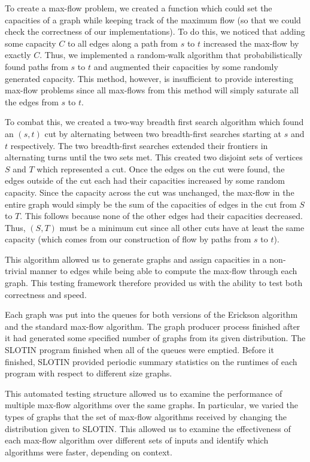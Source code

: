 \documentclass[12pt]{article}
\begin{document}
To create a max-flow problem, we created a function which could set the capacities of a graph while keeping track of the maximum flow (so that we could check the correctness of our implementations). To do this, we noticed that adding some capacity $C$ to all edges along a path from $s$ to $t$ increased the max-flow by exactly $C$. Thus, we implemented a random-walk algorithm that probabilistically found paths from $s$ to $t$ and augmented their capacities by some randomly generated capacity. This method, however, is insufficient to provide interesting max-flow problems since all max-flows from this method will simply saturate all the edges from $s$ to $t$. 

To combat this, we created a two-way breadth first search algorithm which found an $(s,t)$ cut by alternating between two breadth-first searches starting at $s$ and $t$ respectively. The two breadth-first searches extended their frontiers in alternating turns until the two sets met. This created two disjoint sets of vertices $S$ and $T$ which represented a cut. Once the edges on the cut were found, the edges outside of the cut each had their capacities increased by some random capacity. Since the capacity across the cut was unchanged, the max-flow in the entire graph would simply be the sum of the capacities of edges in the cut from $S$ to $T$. This follows because none of the other edges had their capacities decreased. Thus, $(S,T)$ must be a minimum cut since all other cuts have at least the same capacity (which comes from our construction of flow by paths from $s$ to $t$). 

This algorithm allowed us to generate graphs and assign capacities in a non-trivial manner to edges while being able to compute the max-flow through each graph. This testing framework therefore provided us with the ability to test both correctness and speed.

Each graph was put into the queues for both versions of the Erickson algorithm and the standard max-flow algorithm. The graph producer process finished after it had generated some specified number of graphs from its given distribution. The SLOTIN program finished when all of the queues were emptied. Before it finished, SLOTIN provided periodic summary statistics on the runtimes of each program with respect to different size graphs. 

This automated testing structure allowed us to examine the performance of multiple max-flow algorithms over the same graphs. In particular, we varied the types of graphs that the set of max-flow algorithms received by changing the distribution given to SLOTIN. This allowed us to examine the effectiveness of each max-flow algorithm over different sets of inputs and identify which algorithms were faster, depending on context. 
\end{document}
